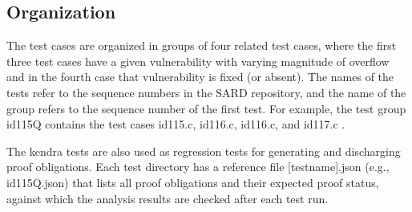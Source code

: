 \documentclass[11pt]{article}
\begin{document}
\subsection{Organization}
The test cases are organized in groups of four related test cases, where the first 
three test cases have a given vulnerability with varying magnitude of overflow and 
in the fourth case that vulnerability is fixed (or absent). The names of the tests 
refer to the sequence numbers in the SARD repository, and the name of the group 
refers to the sequence number of the first test. For example, the test group id115Q 
contains the test cases id115.c, id116.c, id116.c, and id117.c . 

The kendra tests are also used as regression tests for generating and discharging proof 
obligations.
Each test directory has a reference file [testname].json (e.g., id115Q.json) that lists 
all proof obligations
and their expected proof status, against which the analysis results are checked after
each test run.
\end{document}
